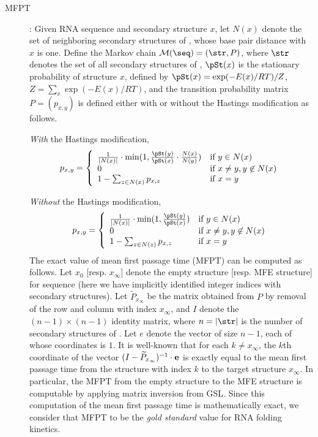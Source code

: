 \begin{description}
\item[MFPT]: Given RNA sequence \seq and secondary structure $x$,
let $N(x)$ denote the set of neighboring secondary structures of
\seq, whose base pair distance with $x$ is one. Define the Markov
chain $\mathcal{M}(\seq)=(\str,P)$, where $\str$ denotes the
set of all secondary structures of \seq, $\pSt(x)$ is the stationary
probability of structure $x$, defined by $\pSt(x)=\exp(-E(x)/RT)/Z$,
$Z=\sum_{x} \exp(-E(x)/RT)$, and the transition probability matrix $P
= ( p_{x,y} )$ is defined either with or without the Hastings
modification as follows.

{\em With} the Hastings modification,
\begin{align}
\label{eq:MFPTwithHastings} p_{x,y} = \left\{
\begin{array}{ll}
\frac{1}{|N(x)|} \cdot \min(1, \frac{\pSt(y)}{\pSt(x)} \cdot
\frac{N(x)}{N(y)}) &\mbox{if $y \in N(x)$}\\
0 &\mbox{if $x \ne y, y \not\in N(x)$}\\
1 - \sum_{\substack{z \in N(x)}} p_{x,z} &\mbox{if $x=y$}\\
\end{array}
\right.
\end{align}

{\em Without} the Hastings modification,
\begin{align}
\label{eq:MFPTwithoutHastings} p_{x,y} = \left\{
\begin{array}{ll}
\frac{1}{|N(x)|} \cdot \min(1, \frac{\pSt(y)}{\pSt(x)} ) &\mbox{if $y
\in N(x)$}\\
0 &\mbox{if $x \ne y, y \not\in N(x)$}\\
1 - \sum_{\substack{z \in N(z)}} p_{x,z} &\mbox{if $x=y$}\\
\end{array}
\right.
\end{align}
The exact value of mean first passage time (MFPT) can be computed as
follows. Let $x_0$ [resp. $x_{\infty}$] denote the empty structure
[resp. MFE structure] for sequence \seq (here we have implicitly
identified integer indices with secondary structures). Let
$\widetilde{P}_{x_{\infty}}$ be the matrix obtained from $P$ by
removal of the row and column with index $x_{\infty}$, and $I$ denote
the $(n-1)\times(n-1)$ identity matrix, where $n=|\str|$ is the
number of secondary structures of \seq. Let $e$ denote the vector of
size $n-1$, each of whose coordinates is $1$. It is well-known
\citep{meyerMFPT} that for each $k\ne x_{\infty}$, the $k$th coordinate
of the vector $(I - \widetilde{P}_{x_{\infty}})^{-1} \cdot {\bf e}$ is
exactly equal to the mean first passage time from the structure with
index $k$ to the target structure $x_{\infty}$. In particular, the
MFPT from the empty structure to the MFE structure is computable by
applying matrix inversion from GSL. Since this computation of the
mean first passage time is mathematically exact, we consider that MFPT
to be the {\em gold standard} value for RNA folding kinetics.


\end{description}
